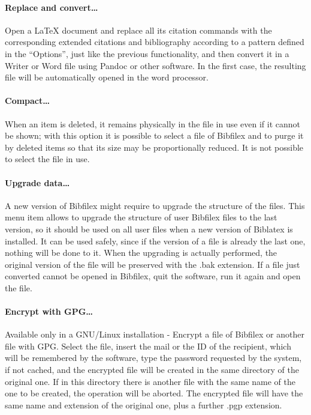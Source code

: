 \documentclass[a4paper,12pt]{report}
\begin{document}
\paragraph{Replace and convert\dots} Open a LaTeX document and replace all its citation commands with the corresponding extended citations and bibliography according to a pattern defined in the “Options”, just like the previous functionality, and then convert it in a Writer or Word file using Pandoc or other software. In the first case, the resulting file will be automatically opened in the word processor.

\paragraph{Compact\dots} When an item is deleted, it remains physically in the file in use even if it cannot be shown; with this option it is possible to select a file of Bibfilex and to purge it by deleted items so that its size may be proportionally reduced. It is not possible to select the file in use.

\paragraph{Upgrade data\dots} A new version of Bibfilex might require to upgrade the structure of the files. This menu item allows to upgrade the structure of user Bibfilex files to the last version, so it should be used on all user files when a new version of Biblatex is installed. It can be used safely, since if the version of a file is already the last one, nothing will be done to it. When the upgrading is actually performed, the original version of the file will be preserved with the .bak extension. If a file just converted cannot be opened in Bibfilex, quit the software, run it again and open the file.

\paragraph{Encrypt with GPG\dots} Available only in a GNU/Linux installation - Encrypt a file of Bibfilex or another file with GPG. Select the file, insert the mail or the ID of the recipient, which will be remembered by the software, type the password requested by the system, if not cached, and the encrypted file will be created in the same directory of the original one. If in this directory there is another file with the same name of the one to be created, the operation will be aborted. The encrypted file will have the same name and extension of the original one, plus a further .pgp extension.
\end{document}
